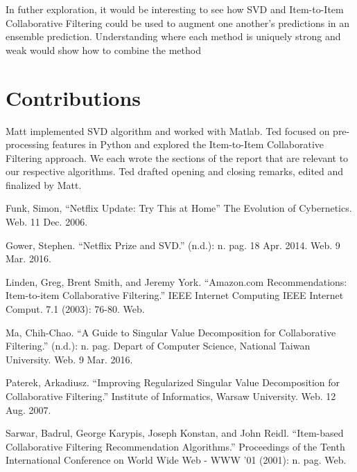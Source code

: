 \documentclass[12pt]{article}
\begin{document}
In futher exploration, it would be interesting to see how SVD and Item-to-Item Collaborative Filtering could be used to augment one another's predictions in an ensemble prediction. Understanding where each method is uniquely strong and weak would show how to combine the method

\section{Contributions}
Matt implemented SVD algorithm and worked with Matlab. Ted focused on pre-processing features in Python and explored the Item-to-Item Collaborative Filtering approach. We each wrote the sections of the report that are relevant to our respective algorithms. Ted drafted opening and closing remarks, edited and finalized by Matt.

\begin{thebibliography}{9}

Funk, Simon, ``Netflix Update: Try This at Home'' The Evolution of Cybernetics. Web. 11 Dec. 2006.

Gower, Stephen. ``Netflix Prize and SVD.'' (n.d.): n. pag. 18 Apr. 2014. Web. 9 Mar. 2016.

Linden, Greg, Brent Smith, and Jeremy York. ``Amazon.com Recommendations: Item-to-item Collaborative Filtering.'' IEEE Internet Computing IEEE Internet Comput. 7.1 (2003): 76-80. Web.

Ma, Chih-Chao. ``A Guide to Singular Value Decomposition for Collaborative Filtering.'' (n.d.): n. pag. Depart of Computer Science, National Taiwan University. Web. 9 Mar. 2016.

Paterek, Arkadiusz. ``Improving Regularized Singular Value Decomposition for Collaborative Filtering.'' Institute of Informatics, Warsaw University. Web. 12 Aug. 2007.

Sarwar, Badrul, George Karypis, Joseph Konstan, and John Reidl. ``Item-based Collaborative Filtering Recommendation Algorithms.'' Proceedings of the Tenth International Conference on World Wide Web - WWW '01 (2001): n. pag. Web.

\end{thebibliography}
\end{document}
